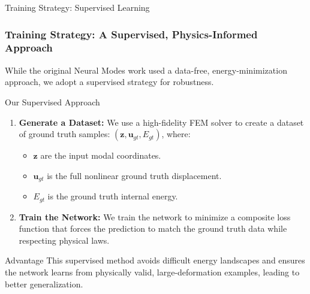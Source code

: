 \documentclass{beamer}
\begin{document}
\begin{frame}{Training Strategy: Supervised Learning}
    \frametitle{Training Strategy: A Supervised, Physics-Informed Approach}
    
    While the original Neural Modes work \cite{Wang_Du_Coros_Thomaszewski_2024} used a data-free, energy-minimization approach, we adopt a supervised strategy for robustness.
    
    \begin{block}{Our Supervised Approach}
        \begin{enumerate}
            \item \textbf{Generate a Dataset:} We use a high-fidelity FEM solver to create a dataset of ground truth samples: \( (\mathbf{z}, \bm{u}_{gt}, E_{gt}) \), where:
            \begin{itemize}
                \item \( \mathbf{z} \) are the input modal coordinates.
                \item \( \bm{u}_{gt} \) is the full nonlinear ground truth displacement.
                \item \( E_{gt} \) is the ground truth internal energy.
            \end{itemize}
            \item \textbf{Train the Network:} We train the network to minimize a composite loss function that forces the prediction to match the ground truth data while respecting physical laws.
        \end{enumerate}
    \end{block}
    
    \begin{alertblock}{Advantage}
        This supervised method avoids difficult energy landscapes and ensures the network learns from physically valid, large-deformation examples, leading to better generalization.
    \end{alertblock}
\end{frame}
\end{document}
